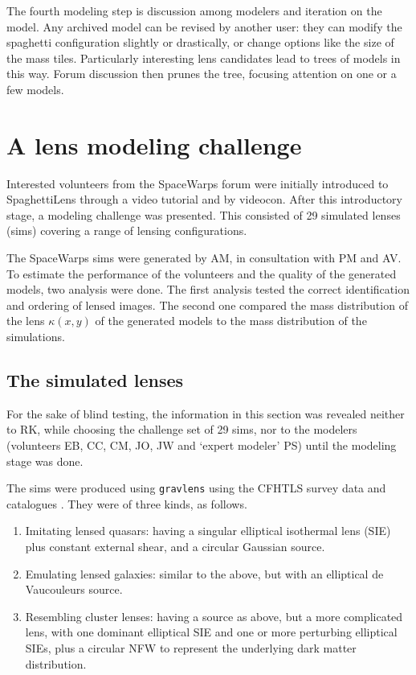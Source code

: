\documentclass[12pt,preprint]{aastex}
\newcommand{\spl}{SpaghettiLens\xspace}
\newcommand{\sw}{SpaceWarps\xspace}
\begin{document}
The fourth modeling step is discussion among modelers and iteration
on the model.  Any archived model can be revised by another user: they
can modify the spaghetti configuration slightly or drastically, or
change options like the size of the mass tiles.  Particularly
interesting lens candidates lead to trees of models in this way.
Forum discussion then prunes the tree, focusing attention on one or a
few models.

\section{A lens modeling challenge} \label{sec:mod_challenge}


Interested volunteers from the \sw forum were initially introduced to
\spl through a video tutorial and by videocon.  After this
introductory stage, a modeling challenge was presented.  This
consisted of 29 simulated lenses (sims) covering a range of lensing
configurations.

The \sw sims were generated by AM, in consultation with PM and AV.
To estimate the performance of the volunteers and the quality of the generated models, two analysis  were done.
The first analysis tested the correct identification and ordering of lensed images.
The second one compared the mass distribution of the lens $\kappa(x, y)$ of the generated models to the mass distribution of the simulations.


\subsection{The simulated lenses} \label{sec:sims}

For the sake of blind testing, the information in this section was
revealed neither to RK, while choosing the challenge set of 29 sims,
nor to the modelers (volunteers EB, CC, CM, JO, JW and `expert
modeler' PS) until the modeling stage was done.

The sims were produced using {\tt gravlens}
\citep{2001astro.ph..2341K,2001astro.ph..2340K} using the CFHTLS survey data
and catalogues \cite{Coupon2009}. They were of three
kinds, as follows.

\begin{enumerate}
  \item Imitating lensed quasars: having a singular elliptical
    isothermal lens (SIE) plus constant external shear, and a circular
    Gaussian source.
  \item Emulating lensed galaxies: similar to the above, but with an
    elliptical de Vaucouleurs source.
  \item Resembling cluster lenses: having a source as above, but a
    more complicated lens, with one dominant elliptical SIE and
    one or more perturbing elliptical SIEs, plus a circular NFW
    \citep{1996ApJ...462..563N,1997ApJ...490..493N} to represent
    the underlying dark matter distribution.
\end{enumerate}
\end{document}
